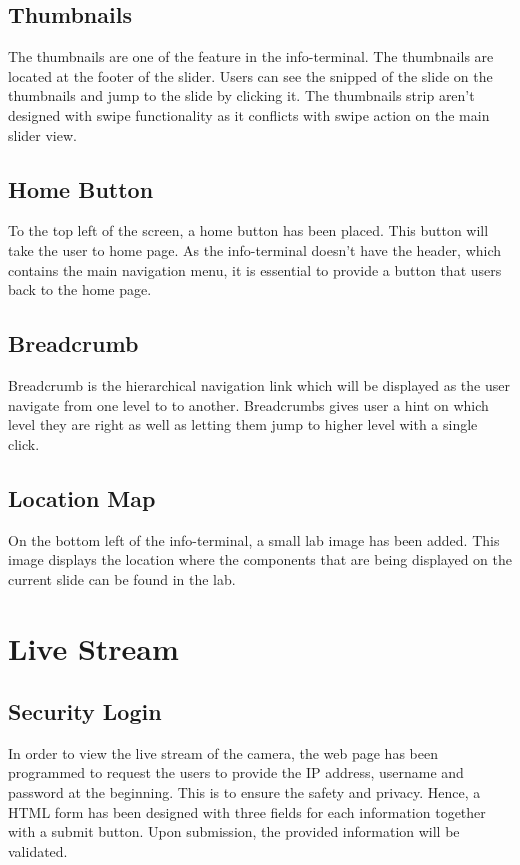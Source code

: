 \subsection*{Thumbnails}
The thumbnails are one of the feature in the info-terminal. The thumbnails are located at the footer of the slider. Users can see the snipped of the slide on the thumbnails and jump to the slide by clicking it. The thumbnails strip aren't designed with swipe functionality as it conflicts with swipe action on the main slider view.

\subsection*{Home Button}
To the top left of the screen, a home button has been placed. This button will take the user to home page. As the info-terminal doesn't have the header, which contains the main navigation menu, it is essential to provide a button that users back to the home page.

\subsection*{Breadcrumb}
Breadcrumb is the hierarchical navigation link which will be displayed as the user navigate from one level to to another. Breadcrumbs gives user a hint on which level they are right as well as letting them jump to higher level with a single click.

\subsection*{Location Map}
On the bottom left of the info-terminal, a small lab image has been added. This image displays the location where the components that are being displayed on the current slide can be found in the lab.

\section{Live Stream}
\subsection*{Security Login}
In order to view the live stream of the camera, the web page has been programmed to request the users to provide the IP address, username and password at the beginning. This is to ensure the safety and privacy. Hence, a HTML form has been designed with three fields for each information together with a submit button. Upon submission, the provided information will be validated.

